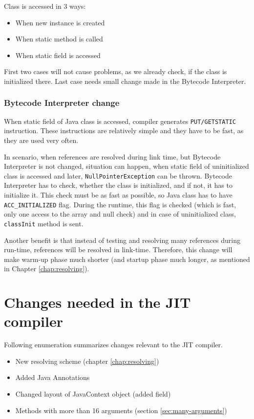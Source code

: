 \documentclass[11pt,twoside,a4paper]{book}
\begin{document}
Class is accessed in 3 ways:

\begin{itemize}
	\item When new instance is created
	\item When static method is called
	\item When static field is accessed
\end{itemize}

First two cases will not cause problems, as we already check, if the class is initialized there.
Last case needs small change made in the Bytecode Interpreter.

\subsubsection{Bytecode Interpreter change}

When static field of Java class is accessed, compiler generates \texttt{PUT/GETSTATIC} instruction.
These instructions are relatively simple and they have to be fast, as they are used very often.

In scenario, when references are resolved during link time, but Bytecode Interpreter is not changed, situation can happen, when static field of uninitialized class is accessed and later, \texttt{NullPointerException} can be thrown.
Bytecode Interpreter has to check, whether the class is initialized, and if not, it has to initialize it.
This check must be as fast as possible, so Java class has to have \texttt{ACC\_INITIALIZED} flag.
During the runtime, this flag is checked (which is fast, only one access to the array and null check) and in case of uninitialized class, \texttt{classInit} method is sent.

Another benefit is that instead of testing and resolving many references during run-time, references will be resolved in link-time. Therefore, this change will make warm-up phase much shorter (and startup phase much longer, as mentioned in Chapter \ref{chap:resolving}).

\section{Changes needed in the JIT compiler}

Following enumeration summarizes changes relevant to the JIT compiler.

\begin{itemize}
	\item New resolving scheme (chapter \ref{chap:resolving})
	\item Added Java Annotations 
	\item Changed layout of JavaContext object (added field)
	\item Methods with more than 16 arguments (section \ref{sec:many-arguments})
\end{itemize}
\end{document}
